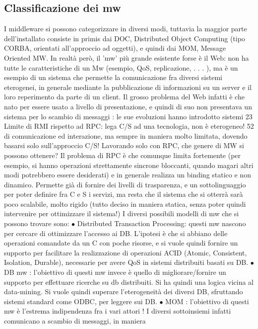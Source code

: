 \subsection{Classificazione dei mw}
I middleware si possono categorizzare in diversi modi, tuttavia la maggior parte
dell'installato consiste in primis dai DOC, Distributed Object Computing (tipo
CORBA, orientati all'approccio ad oggetti), e quindi dai MOM, Message Oriented MW. In realtà però, il 'mw' più grande
esistente forse è il Web: non ha
tutte le caratteristiche di un Mw (esempio, QoS, replicazione, . . . ), ma è un
esempio di un sistema che permette la comunicazione fra diversi sistemi eterogenei, in generale mediante la
pubblicazione di informazioni su un server e il loro
reperimento da parte di un client. Il grosso problema del Web infatti è che nato
per essere usato a livello di presentazione, e quindi di suo non presentava un
sistema per lo scambio di messaggi : le sue evoluzioni hanno introdotto sistemi
23 Limite
di RMI rispetto ad RPC: lega C/S ad una tecnologia, non è eterogeneo!
52
di comunicazione ed interazione, ma sempre in maniera molto limitata, dovendo
basarsi solo sull'approccio C/S!
Lavorando solo con RPC, che genere di MW si possono ottenere? Il problema
di RPC è che comunque limita fortemente (per esempio, si hanno operazioni
strettamente sincrone bloccanti, quando magari altri modi potrebbero essere
desiderati) e in generale realizza un binding statico e non dinamico. Permette
già di fornire dei livelli di trasparenza, e un sottolinguaggio per poter definire
fra C e S i servizi, ma resta che il sistema che si otterrà sarà poco scalabile,
molto rigido (tutto deciso in maniera statica, senza poter quindi intervenire per
ottimizzare il sistema!)
I diversi possibili modelli di mw che si possono trovare sono:
$\bullet$ Distributed Transaction Processing: questi mw nascono per cercare di
ottimizzare l'accesso ai DB. L'ipotesi è che si abbiano delle operazioni
comandate da un C con poche risorse, e si vuole quindi fornire un supporto
per facilitare la realizzazione di operazioni ACID (Atomic, Consistent,
Isolation, Durable), necessarie per avere QoS in sistemi distribuiti basati
su DB.
$\bullet$ DB mw : l'obiettivo di questi mw invece è quello di migliorare/fornire un
supporto per effettuare ricerche su db distribuiti. Si ha quindi una logica
vicina al data-mining. Si vuole quindi superare l'eterogeneità dei diversi
DB, sfruttando sistemi standard come ODBC, per leggere sui DB.
$\bullet$ MOM : l'obiettivo di questi mw è l'estrema indipendenza fra i vari attori ! I
diversi sottoinsiemi infatti comunicano a scambio di messaggi, in maniera
